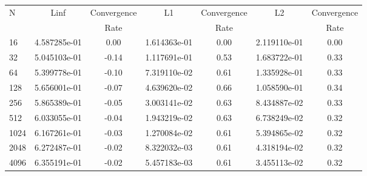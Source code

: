 \documentclass[12pt]{article}
\begin{document}
	\begin{tabular}{l|c|c|c|c|c|c}
		N&Linf&Convergence&L1&Convergence&L2&Convergence\\
		&&Rate&&Rate&&Rate\\
		\hline
		16&4.587285e-01&0.00&1.614363e-01&0.00&2.119110e-01&0.00\\
		\hline
		32&5.045103e-01&-0.14&1.117691e-01&0.53&1.683722e-01&0.33\\
		\hline
		64&5.399778e-01&-0.10&7.319110e-02&0.61&1.335928e-01&0.33\\
		\hline
		128&5.656001e-01&-0.07&4.639620e-02&0.66&1.058590e-01&0.34\\
		\hline
		256&5.865389e-01&-0.05&3.003141e-02&0.63&8.434887e-02&0.33\\
		\hline
		512&6.033055e-01&-0.04&1.943219e-02&0.63&6.738249e-02&0.32\\
		\hline
		1024&6.167261e-01&-0.03&1.270084e-02&0.61&5.394865e-02&0.32\\
		\hline
		2048&6.272487e-01&-0.02&8.322032e-03&0.61&4.318194e-02&0.32\\
		\hline
		4096&6.355191e-01&-0.02&5.457183e-03&0.61&3.455113e-02&0.32\\
	\end{tabular}
\end{document}
